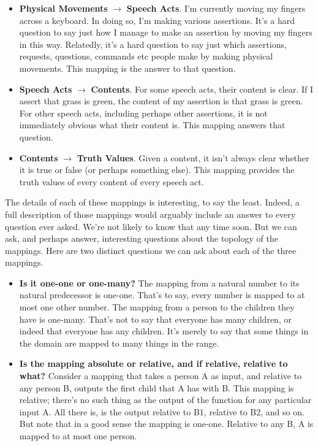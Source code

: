 \begin{itemize}
\item \textbf{Physical Movements }\(\rightarrow\)\textbf{ Speech Acts}. I'm currently moving my fingers across a keyboard. In doing so, I'm making various assertions. It's a hard question to say just how I manage to make an assertion by moving my fingers in this way. Relatedly, it's a hard question to say just which assertions, requests, questions, commands etc people make by making physical movements. This mapping is the answer to that question.
\item \textbf{Speech Acts }\(\rightarrow\)\textbf{ Contents}. For some speech acts, their content is clear. If I assert that grass is green, the content of my assertion is that grass is green. For other speech acts, including perhaps other assertions, it is not immediately obvious what their content is. This mapping answers that question.
\item \textbf{Contents }\(\rightarrow\)\textbf{ Truth Values}. Given a content, it isn't always clear whether it is true or false (or perhaps something else). This mapping provides the truth values of every content of every speech act.
\end{itemize}

\noindent The details of each of these mappings is interesting, to say the least. Indeed, a full description of those mappings would arguably include an answer to every question ever asked. We're not likely to know that any time soon. But we can ask, and perhaps answer, interesting questions about the topology of the mappings. Here are two distinct questions we can ask about each of the three mappings.

\begin{itemize}
\item \textbf{Is it one-one or one-many? }The mapping from a natural number to its natural predecessor is one-one. That's to say, every number is mapped to at most one other number. The mapping from a person to the children they have is one-many. That's not to say that everyone has many children, or indeed that everyone has any children. It's merely to say that some things in the domain are mapped to many things in the range.
\item \textbf{Is the mapping absolute or relative, and if relative, relative to what?} Consider a mapping that takes a person A as input, and relative to any person B, outputs the first child that A has with B. This mapping is relative; there's no such thing as the output of the function for any particular input A. All there is, is the output relative to B1, relative to B2, and so on. But note that in a good sense the mapping is one-one. Relative to any B, A is mapped to at most one person.
\end{itemize}

